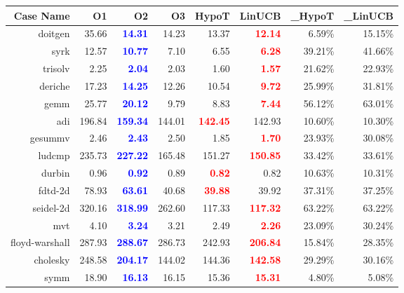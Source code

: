 \documentclass[landscape]{report}
\begin{document}
\begin{longtable}{rrrrrrrr}
\toprule
Case Name	& O1	& O2	& O3	& HypoT	& LinUCB	& \Delta_{HypoT}	& \Delta_{LinUCB} \\
\midrule
doitgen	& 35.66	& \textcolor{blue}{\textbf{14.31}}	& 14.23	& 13.37	& \textcolor{red}{\textbf{12.14}}	& 6.59\%	& 15.15\% \\
syrk	& 12.57	& \textcolor{blue}{\textbf{10.77}}	& 7.10	& 6.55	& \textcolor{red}{\textbf{6.28}}	& 39.21\%	& 41.66\% \\
trisolv	& 2.25	& \textcolor{blue}{\textbf{2.04}}	& 2.03	& 1.60	& \textcolor{red}{\textbf{1.57}}	& 21.62\%	& 22.93\% \\
deriche	& 17.23	& \textcolor{blue}{\textbf{14.25}}	& 12.26	& 10.54	& \textcolor{red}{\textbf{9.72}}	& 25.99\%	& 31.81\% \\
gemm	& 25.77	& \textcolor{blue}{\textbf{20.12}}	& 9.79	& 8.83	& \textcolor{red}{\textbf{7.44}}	& 56.12\%	& 63.01\% \\
adi	& 196.84	& \textcolor{blue}{\textbf{159.34}}	& 144.01	& \textcolor{red}{\textbf{142.45}}	& 142.93	& 10.60\%	& 10.30\% \\
gesummv	& 2.46	& \textcolor{blue}{\textbf{2.43}}	& 2.50	& 1.85	& \textcolor{red}{\textbf{1.70}}	& 23.93\%	& 30.08\% \\
ludcmp	& 235.73	& \textcolor{blue}{\textbf{227.22}}	& 165.48	& 151.27	& \textcolor{red}{\textbf{150.85}}	& 33.42\%	& 33.61\% \\
durbin	& 0.96	& \textcolor{blue}{\textbf{0.92}}	& 0.89	& \textcolor{red}{\textbf{0.82}}	& 0.82	& 10.63\%	& 10.31\% \\
fdtd-2d	& 78.93	& \textcolor{blue}{\textbf{63.61}}	& 40.68	& \textcolor{red}{\textbf{39.88}}	& 39.92	& 37.31\%	& 37.25\% \\
seidel-2d	& 320.16	& \textcolor{blue}{\textbf{318.99}}	& 262.60	& 117.33	& \textcolor{red}{\textbf{117.32}}	& 63.22\%	& 63.22\% \\
mvt	& 4.10	& \textcolor{blue}{\textbf{3.24}}	& 3.21	& 2.49	& \textcolor{red}{\textbf{2.26}}	& 23.09\%	& 30.24\% \\
floyd-warshall	& 287.93	& \textcolor{blue}{\textbf{288.67}}	& 286.73	& 242.93	& \textcolor{red}{\textbf{206.84}}	& 15.84\%	& 28.35\% \\
cholesky	& 248.58	& \textcolor{blue}{\textbf{204.17}}	& 144.02	& 144.36	& \textcolor{red}{\textbf{142.58}}	& 29.29\%	& 30.16\% \\
symm	& 18.90	& \textcolor{blue}{\textbf{16.13}}	& 16.15	& 15.36	& \textcolor{red}{\textbf{15.31}}	& 4.80\%	& 5.08\% \\

\end{longtable}
\end{document}
